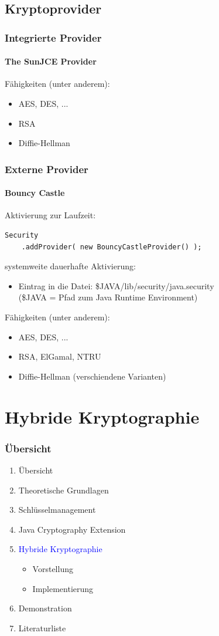\documentclass{beamer}
\begin{document}
\subsection*{Kryptoprovider}
\begin{frame}
\frametitle{Integrierte Provider}
\framesubtitle{The SunJCE Provider}
Fähigkeiten (unter anderem):
\begin{itemize}
\item AES, DES, ...
\item RSA
\item Diffie-Hellman
\end{itemize}
\end{frame}

\begin{frame}[fragile]
\frametitle{Externe Provider}
\framesubtitle{Bouncy Castle}
Aktivierung zur Laufzeit:
\begin{lstlisting}[frame=shadowbox]
 Security
 	.addProvider( new BouncyCastleProvider() );
\end{lstlisting}
systemweite dauerhafte Aktivierung:
\begin{itemize}
\item Eintrag in die Datei: \$JAVA/lib/security/java.security\\
(\$JAVA = Pfad zum Java Runtime Environment)
\end{itemize}

\begin{block}{Fähigkeiten (unter anderem):}

\begin{itemize}
\item AES, DES, ...
\item RSA, ElGamal, NTRU
\item Diffie-Hellman (verschiendene Varianten)
\end{itemize}
\end{block}
\end{frame}


\section{Hybride Kryptographie}
\begin{frame}
\frametitle{Übersicht}
\begin{enumerate}
\item Übersicht
\item Theoretische Grundlagen
\item Schlüsselmanagement
\item Java Cryptography Extension
\item \textcolor{blue}{Hybride Kryptographie}
\begin{itemize}
	\item Vorstellung
	\item Implementierung
\end{itemize}
\item Demonstration
\item Literaturliste
\end{enumerate}
\end{frame}
\end{document}

